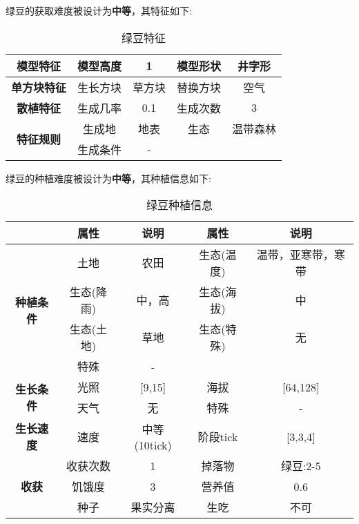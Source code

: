 绿豆的获取难度被设计为\textbf{中等}，其特征如下:
\begin{table}[H]
    \centering
    \caption{绿豆特征}
    \label{table:绿豆特征}
    \setlength{\tabcolsep}{4mm}
    \begin{tabular}{c|cc|cc}
        \toprule
        \textbf{模型特征}                  & 模型高度 & 1      & 模型形状 & 井字形 \\
        \midrule
        \textbf{单方块特征}                & 生长方块 & 草方块 & 替换方块 & 空气   \\
        \midrule
        \textbf{散植特征}                  & 生成几率 & 0.1    & 生成次数 & 3      \\
        \midrule
        \multirow{2}{*}{\textbf{特征规则}} & 生成地   & 地表   & 生态     & 温带森林   \\
                                           & 生成条件 & -              \\
        \bottomrule
    \end{tabular}
\end{table}


绿豆的种植难度被设计为\textbf{中等}，其种植信息如下:

\begin{table}[H]
    \centering
    \caption{绿豆种植信息}
    \label{table:绿豆种植信息}
    \setlength{\tabcolsep}{4mm}
    \begin{tabular}{c|cc|cc}
        \toprule
                                           & \textbf{属性} & \textbf{说明}   & \textbf{属性} & \textbf{说明} \\
        \midrule
        \multirow{4}{*}{\textbf{种植条件}} & 土地          & 农田            & 生态(温度)    & 温带，亚寒带，寒带    \\
                                           & 生态(降雨)    & 中，高          & 生态(海拔)    & 中            \\
                                           & 生态(土地)    & 草地            & 生态(特殊)    & 无            \\
                                           & 特殊          & -                                 \\
        \midrule
        \multirow{2}{*}{\textbf{生长条件}} & 光照          & [9,15]         & 海拔          & [64,128]      \\
                                           & 天气          & 无              & 特殊          & -      \\
        \midrule
        \textbf{生长速度}                  & 速度          & 中等(10tick)       & 阶段tick      & [3,3,4]       \\
        \midrule
        \multirow{3}{*}{\textbf{收获}}     & 收获次数      & 1               & 掉落物        & 绿豆:2-5      \\
                                           & 饥饿度        & 3               & 营养值        & 0.6           \\
                                           & 种子          & 果实分离        & 生吃          & 不可          \\
        \bottomrule
    \end{tabular}
\end{table}

